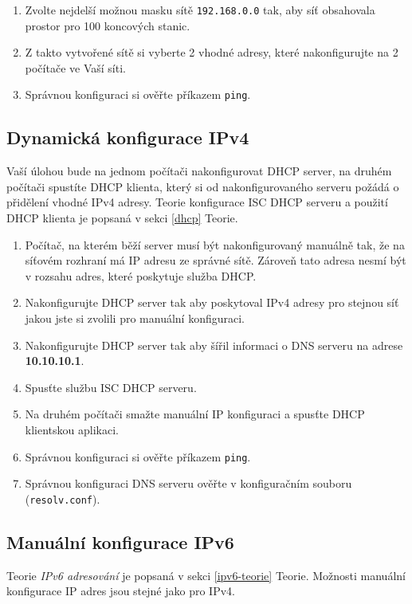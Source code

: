 \begin{enumerate}
    \item Zvolte nejdelší možnou masku sítě \texttt{192.168.0.0} tak, aby síť
        obsahovala prostor pro 100 koncových stanic.
    \item Z takto vytvořené sítě si vyberte 2 vhodné adresy, které
        nakonfigurujte na 2 počítače ve Vaší síti.
    \item Správnou konfiguraci si ověřte příkazem {\tt ping}.
\end{enumerate}

\subsection{Dynamická konfigurace IPv4}

Vaší úlohou bude na jednom počítači nakonfigurovat DHCP server, na druhém
počítači spustíte DHCP klienta, který si od nakonfigurovaného serveru požádá o
přidělení vhodné IPv4 adresy. Teorie konfigurace ISC DHCP serveru a použití
DHCP klienta je popsaná v sekci \ref{dhcp} Teorie.

\begin{enumerate}
    \item Počítač, na kterém běží server musí být nakonfigurovaný manuálně tak,
        že na síťovém rozhraní má IP adresu ze správné sítě. Zároveň tato
        adresa nesmí být v rozsahu adres, které poskytuje služba DHCP.
    \item Nakonfigurujte DHCP server tak aby poskytoval IPv4 adresy pro stejnou
        síť jakou jste si zvolili pro manuální konfiguraci.
    \item Nakonfigurujte DHCP server tak aby šířil informaci o DNS serveru na
        adrese {\bf 10.10.10.1}.
    \item Spusťte službu ISC DHCP serveru.
    \item Na druhém počítači smažte manuální IP konfiguraci a spusťte DHCP
        klientskou aplikaci.
    \item Správnou konfiguraci si ověřte příkazem {\tt ping}.
    \item Správnou konfiguraci DNS serveru ověřte v konfiguračním souboru
        (\texttt{resolv.conf}).
\end{enumerate}

\subsection{Manuální konfigurace IPv6}
Teorie \emph{IPv6 adresování} je popsaná v sekci \ref{ipv6-teorie} Teorie.
Možnosti manuální konfigurace IP adres jsou stejné jako pro IPv4.

